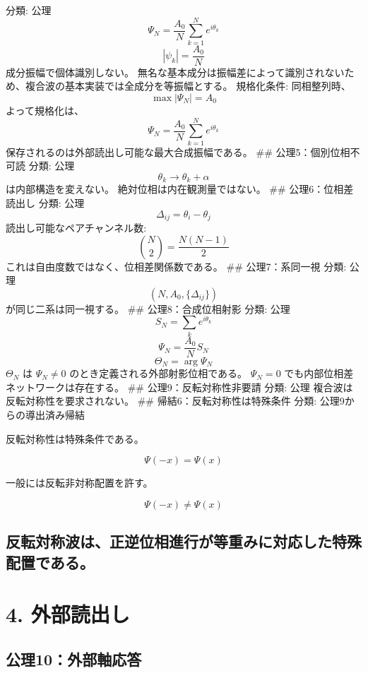 \documentclass[
  a4paper,
]{ltjsarticle}
\begin{document}
分類: 公理 \[
\Psi_N=\frac{A_0}{N}\sum_{k=1}^{N}e^{i\theta_k}
\] \[
|\psi_k|=\frac{A_0}{N}
\] 成分振幅で個体識別しない。
無名な基本成分は振幅差によって識別されないため、複合波の基本実装では全成分を等振幅とする。
規格化条件: 同相整列時、 \[
\max|\Psi_N|=A_0
\] よって規格化は、 \[
\Psi_N=\frac{A_0}{N}\sum_{k=1}^{N}e^{i\theta_k}
\] 保存されるのは外部読出し可能な最大合成振幅である。 \#\#
公理5：個別位相不可読 分類: 公理 \[
\theta_k\rightarrow\theta_k+\alpha
\] は内部構造を変えない。 絶対位相は内在観測量ではない。 \#\#
公理6：位相差読出し 分類: 公理 \[
\Delta_{ij}=\theta_i-\theta_j
\] 読出し可能なペアチャンネル数: \[
\binom{N}{2}=\frac{N(N-1)}{2}
\] これは自由度数ではなく、位相差関係数である。 \#\# 公理7：系同一視
分類: 公理 \[
(N,A_0,\{\Delta_{ij}\})
\] が同じ二系は同一視する。 \#\# 公理8：合成位相射影 分類: 公理 \[
S_N=\sum_k e^{i\theta_k}
\] \[
\Psi_N=\frac{A_0}{N}S_N
\] \[
\Theta_N=\arg\Psi_N
\] \(\Theta_N\) は \(\Psi_N\neq0\) のとき定義される外部射影位相である。
\(\Psi_N=0\) でも内部位相差ネットワークは存在する。 \#\#
公理9：反転対称性非要請 分類: 公理 複合波は反転対称性を要求されない。
\#\# 帰結6：反転対称性は特殊条件 分類: 公理9からの導出済み帰結

反転対称性は特殊条件である。

\[
\Psi(-x)=\Psi(x)
\]

一般には反転非対称配置を許す。

\[
\Psi(-x)\neq\Psi(x)
\]

\subsection{反転対称波は、正逆位相進行が等重みに対応した特殊配置である。}\label{ux53cdux8ee2ux5bfeux79f0ux6ce2ux306fux6b63ux9006ux4f4dux76f8ux9032ux884cux304cux7b49ux91cdux307fux306bux5bfeux5fdcux3057ux305fux7279ux6b8aux914dux7f6eux3067ux3042ux308b}

\section{4. 外部読出し}\label{ux5916ux90e8ux8aadux51faux3057}

\subsection{公理10：外部軸応答}\label{ux516cux740610ux5916ux90e8ux8ef8ux5fdcux7b54}
\end{document}
